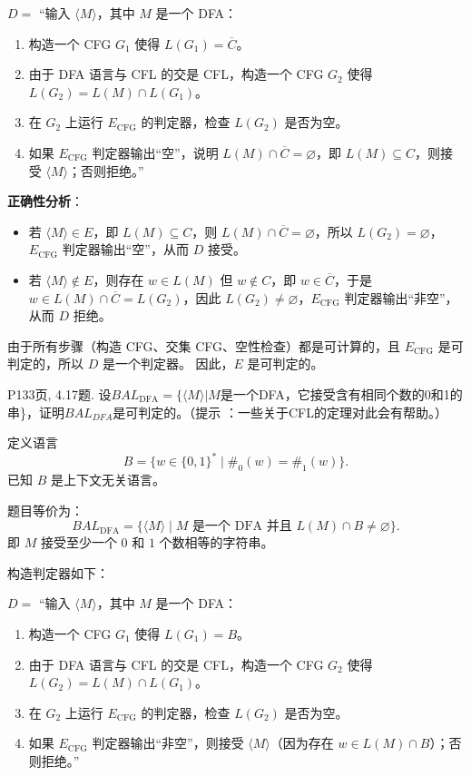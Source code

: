 \documentclass[11pt,addpoints,answers]{exam}
\begin{document}
\begin{questions}
\begin{solution}
        \(D =\) “输入 \(\langle M \rangle\)，其中 \(M\) 是一个 DFA：
        \begin{enumerate}
            \item 构造一个 CFG \(G_1\) 使得 \(L(G_1) = \overline{C}\)。
            \item 由于 DFA 语言与 CFL 的交是 CFL，构造一个 CFG \(G_2\) 使得 \(L(G_2) = L(M) \cap L(G_1)\)。
            \item 在 \(G_2\) 上运行 \(E_{\text{CFG}}\) 的判定器，检查 \(L(G_2)\) 是否为空。
            \item 如果 \(E_{\text{CFG}}\) 判定器输出“空”，说明 \(L(M) \cap \overline{C} = \varnothing\)，即 \(L(M) \subseteq C\)，则接受 \(\langle M \rangle\)；否则拒绝。”
        \end{enumerate}
        \textbf{正确性分析}：
        \begin{itemize}
            \item 若 \(\langle M \rangle \in E\)，即 \(L(M) \subseteq C\)，则 \(L(M) \cap \overline{C} = \varnothing\)，所以 \(L(G_2) = \varnothing\)，\(E_{\text{CFG}}\) 判定器输出“空”，从而 \(D\) 接受。
            \item 若 \(\langle M \rangle \notin E\)，则存在 \(w \in L(M)\) 但 \(w \notin C\)，即 \(w \in \overline{C}\)，于是 \(w \in L(M) \cap \overline{C} = L(G_2)\)，因此 \(L(G_2) \neq \varnothing\)，\(E_{\text{CFG}}\) 判定器输出“非空”，从而 \(D\) 拒绝。
        \end{itemize}
        由于所有步骤（构造 CFG、交集 CFG、空性检查）都是可计算的，且 \(E_{\text{CFG}}\) 是可判定的，所以 \(D\) 是一个判定器。  
        因此，\(E\) 是可判定的。
	\end{solution}  
	
	\question P133页, 4.17题.
	设$BAL_\text{DFA}=\{\langle M\rangle|M$是一个DFA，它接受含有相同个数的0和1的串\}，证明$BAL_{DFA}$是可判定的。（提示 ：一些关于CFL的定理对此会有帮助。）
	\begin{solution}
		定义语言 
        \[
        B = \{ w \in \{0,1\}^* \mid \#_0(w) = \#_1(w) \}.
        \]
        已知 \(B\) 是上下文无关语言。
        
        题目等价为：
        \[
        BAL_{\text{DFA}} = \{ \langle M \rangle \mid M \text{ 是一个 DFA 并且 } L(M) \cap B \neq \varnothing \}.
        \]
        即 \(M\) 接受至少一个 \(0\) 和 \(1\) 个数相等的字符串。
        
        构造判定器如下：
        
        \(D =\) “输入 \(\langle M \rangle\)，其中 \(M\) 是一个 DFA：
        \begin{enumerate}
            \item 构造一个 CFG \(G_1\) 使得 \(L(G_1) = B\)。
            \item 由于 DFA 语言与 CFL 的交是 CFL，构造一个 CFG \(G_2\) 使得 \(L(G_2) = L(M) \cap L(G_1)\)。
            \item 在 \(G_2\) 上运行 \(E_{\text{CFG}}\) 的判定器，检查 \(L(G_2)\) 是否为空。
            \item 如果 \(E_{\text{CFG}}\) 判定器输出“非空”，则接受 \(\langle M \rangle\)（因为存在 \(w \in L(M) \cap B\)）；否则拒绝。”
        \end{enumerate}
        

\end{solution}
\end{questions}
\end{document}
